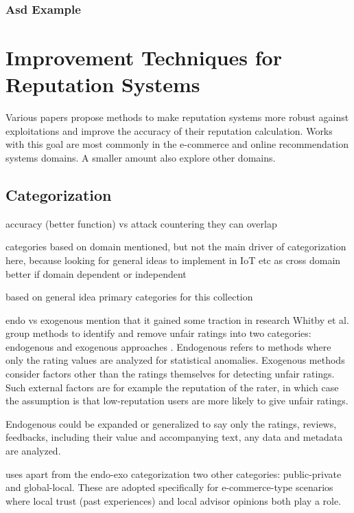 \documentclass[%
    ]{\PathToTumTemplate/thesis/tum_thesis}
\begin{document}
\subsubsection{Asd Example}



\section{Improvement Techniques for Reputation Systems}\label{sec:related_improvements}

Various papers propose methods to make reputation systems more robust against exploitations and improve the accuracy of their reputation calculation. Works with this goal are most commonly in the e-commerce and online recommendation systems domains. A smaller amount also explore other domains. 


\subsection{Categorization}

accuracy (better function) vs attack countering
they can overlap

categories based on domain 
mentioned, but not the main driver of categorization here, because looking for general ideas to implement in IoT etc as cross domain
better if domain dependent or independent

based on general idea
primary categories for this collection

endo vs exogenous
mention that it gained some traction in research
Whitby et al. group methods to identify and remove unfair ratings into two categories: endogenous and exogenous approaches \cite{whitby_filtering_2014}. Endogenous refers to methods where only the rating values are analyzed for statistical anomalies. Exogenous methods consider factors other than the ratings themselves for detecting unfair ratings. Such external factors are for example the reputation of the rater, in which case the assumption is that low-reputation users are more likely to give unfair ratings.

Endogenous could be expanded or generalized to say only the ratings, reviews, feedbacks, including their value and accompanying text, any data and metadata are analyzed.

\cite{zhang_detailed_2008} uses apart from the endo-exo categorization two other categories: public-private and global-local. These are adopted specifically for e-commerce-type scenarios where local trust (past experiences) and local advisor opinions both play a role.
\end{document}
